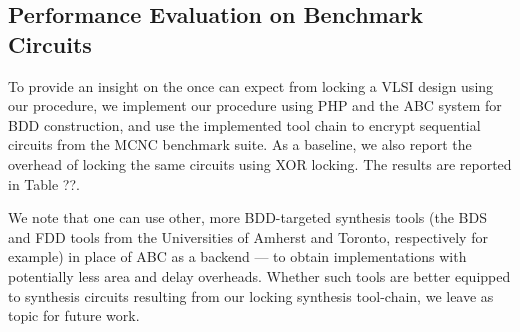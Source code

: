 


\subsection{Performance Evaluation on Benchmark Circuits}
To provide an insight on the once can expect from locking a VLSI design using our procedure, we implement our procedure using PHP and the ABC system \cite{} for BDD construction, and use the implemented tool chain to encrypt sequential circuits from the MCNC benchmark suite. As a baseline, we also report the overhead of locking the same circuits using XOR locking. The results are reported in Table ??.

We note that one can use other, more BDD-targeted synthesis tools (the BDS and FDD tools from the Universities of Amherst and Toronto, respectively for example) in place of ABC as a backend --- to obtain implementations with potentially less area and delay overheads. Whether such tools are better equipped to synthesis circuits resulting from our locking synthesis tool-chain, we leave as topic for future work.

